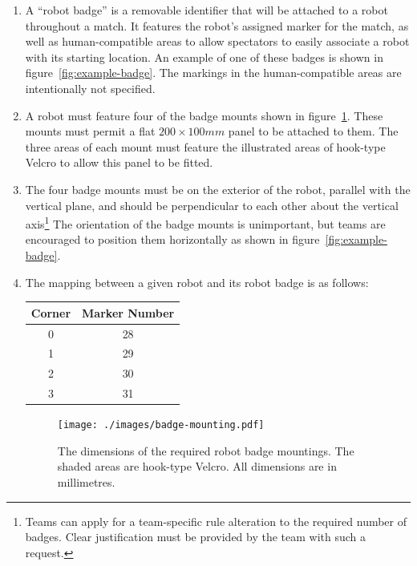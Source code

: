 \begin{enumerate}
\item A ``robot badge'' is a removable identifier that will be attached to a robot throughout a match.
      It features the robot's assigned marker for the match, as well as human-compatible areas to allow spectators to easily associate a robot with its starting location.
      An example of one of these badges is shown in figure~\ref{fig:example-badge}.
      The markings in the human-compatible areas are intentionally not specified.

\item A robot must feature four of the badge mounts shown in figure~\ref{fig:badge-mounting}.
      These mounts must permit a flat $200 \times 100mm$ panel to be attached to them.
      The three areas of each mount must feature the illustrated areas of hook-type Velcro to allow this panel to be fitted.

\item The four badge mounts must be on the exterior of the robot, parallel with the vertical plane, and should be perpendicular to each other about the vertical axis\footnote{Teams can apply for a team-specific rule alteration to the required number of badges.
      Clear justification must be provided by the team with such a request.}
      The orientation of the badge mounts is unimportant, but teams are encouraged to position them horizontally as shown in figure~\ref{fig:example-badge}.

\item The mapping between a given robot and its robot badge is as follows:

\begin{center}
  \begin{tabular}{cc}
    \toprule
    \textbf{Corner} & \textbf{Marker Number} \\
    \midrule
    0 & 28 \\
    1 & 29 \\
    2 & 30 \\
    3 & 31 \\
    \bottomrule
  \end{tabular}
\end{center}

\begin{figure}
  \centering
  \texttt{[image: ./images/badge-mounting.pdf]}
  \caption{The dimensions of the required robot badge mountings.
           The shaded areas are hook-type Velcro.
           All dimensions are in millimetres.}
  \label{fig:badge-mounting}
\end{figure}

\end{enumerate}

